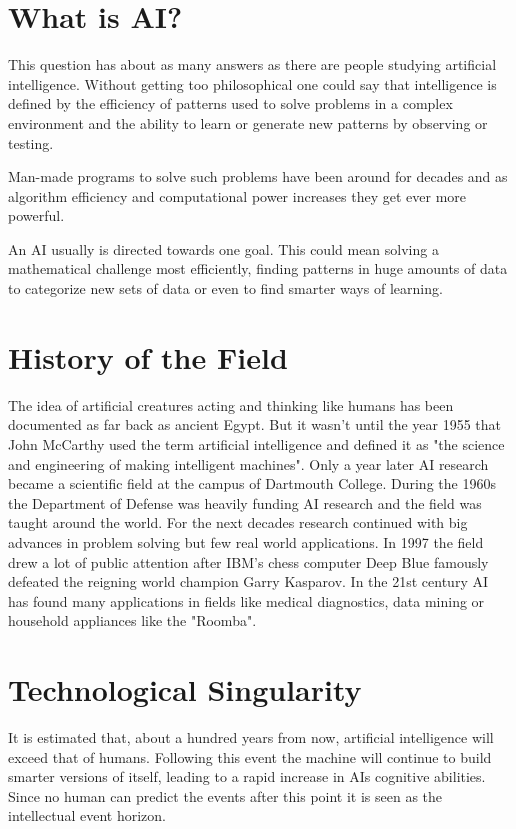 \section{What is AI?}

This question has about as many answers as there are people studying artificial intelligence. Without getting too philosophical one could say that intelligence is defined by the efficiency of patterns used to solve problems in a complex environment and the ability to learn or generate new patterns by observing or testing.

Man-made programs to solve such problems have been around for decades and as algorithm efficiency and computational power increases they get ever more powerful.

An AI usually is directed towards one goal. This could mean solving a mathematical challenge most efficiently, finding patterns in huge amounts of data to categorize new sets of data or even to find smarter ways of learning.


\section{History of the Field}

The idea of artificial creatures acting and thinking like humans has been documented as far back as ancient Egypt. But it wasn't until the year 1955 that John McCarthy used the term artificial intelligence and defined it as "the science and engineering of making intelligent machines".
Only a year later AI research became a scientific field at the campus of Dartmouth College. During the 1960s the Department of Defense was heavily funding AI research and the field was taught around the world.
For the next decades research continued with big advances in problem solving but few real world applications. In 1997 the field drew a lot of public attention after IBM's chess computer Deep Blue famously defeated the reigning world champion Garry Kasparov.
In the 21st century AI has found many applications in fields like medical diagnostics, data mining or household appliances like the "Roomba". 

\section{Technological Singularity}

It is estimated that, about a hundred years from now, artificial intelligence will exceed that of humans. Following this event the machine will continue to build smarter versions of itself, leading to a rapid increase in AIs cognitive abilities. Since no human can predict the events after this point it is seen as the intellectual event horizon.

